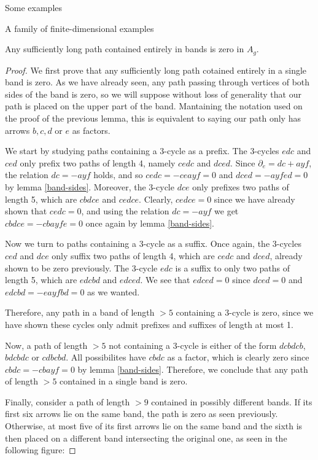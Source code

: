 \begin{chapter}{Some examples}
\begin{section}{A family of finite-dimensional examples}
\begin{lemma} Any sufficiently long path contained entirely in bands is zero in $A_g$.
\end{lemma}
\begin{proof} We first prove that any sufficiently long path cotained entirely in a single band is zero. As we have already seen, any path passing through vertices of both sides of the band is zero, so we will suppose without loss of generality that our path is placed on the upper part of the band. Mantaining the notation used on the proof of the previous lemma, this is equivalent to saying our path only has arrows $b, c, d$ or $e$ as factors.

We start by studying paths containing a $3$-cycle as a prefix. The $3$-cycles $edc$ and $ced$ only prefix two paths of length 4, namely $cedc$ and $dced$. Since $\partial_e = dc + ayf$, the relation $dc = -ayf$ holds, and so $cedc=-ceayf=0$ and $dced=-ayfed=0$ by lemma \ref{band-sides}. Moreover, the $3$-cycle $dce$ only prefixes two paths of length 5, which are $cbdce$ and $cedce$. Clearly, $cedce=0$ since we have already shown that $cedc=0$, and using the relation $dc=-ayf$ we get $cbdce = - cbayfe=0$ once again by lemma \ref{band-sides}.

Now we turn to paths containing a $3$-cycle as a suffix. Once again, the $3$-cycles $ced$ and $dce$ only suffix two paths of length 4, which are $cedc$ and $dced$, already shown to be zero previously. The $3$-cycle $edc$ is a suffix to only two paths of length 5, which are $edcbd$ and $edced$. We see that $edced=0$ since $dced=0$ and $edcbd=-eayfbd=0$ as we wanted.

Therefore, any path in a band of length $>5$ containing a 3-cycle is zero, since we have shown these cycles only admit prefixes and suffixes of length at most 1.

Now, a path of length $>5$ not containing a 3-cycle is either of the form $dcbdcb$, $bdcbdc$ or $cdbcbd$. All possibilites have $cbdc$ as a factor, which is clearly zero since $cbdc = -cbayf = 0$ by lemma \ref{band-sides}. Therefore, we conclude that any path of length $>5$ contained in a single band is zero.

Finally, consider a path of length $>9$ contained in possibly different bands. If its first six arrows lie on the same band, the path is zero as seen previously. Otherwise, at most five of its first arrows lie on the same band and the sixth is then placed on a different band intersecting the original one, as seen in the following figure:


\end{proof}
\end{section}
\end{chapter}
